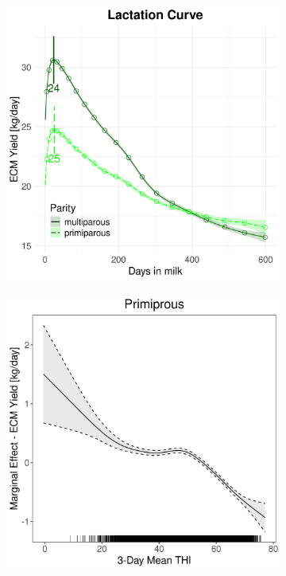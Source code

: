 \begin{figure}[H]
\begin{subfigure}[b]{0.45\textwidth}
        \includegraphics[width=\textwidth]{thesis/figures/models/ecm/after2010/je_ecm_after2010/je_ecm_after2010_marginal_dim_milk_combined.png}
    \end{subfigure}
    \begin{subfigure}[b]{0.45\textwidth}
        \centering
        \includegraphics[width=\textwidth]{thesis/figures/models/ecm/after2010/je_ecm_after2010/je_ecm_after2010_marginal_thi_milk_primi.png}

\end{subfigure}
\end{figure}
